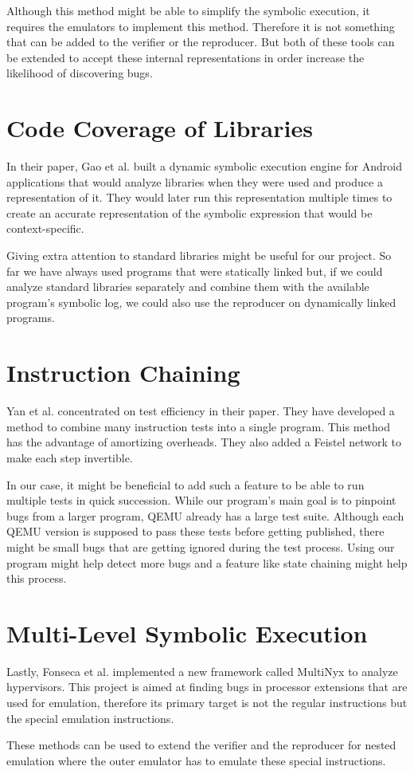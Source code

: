 Although this method might be able to simplify the symbolic execution, it requires the emulators to implement this method.
Therefore it is not something that can be added to the verifier or the reproducer.
But both of these tools can be extended to accept these internal representations in order increase the likelihood of discovering bugs.

\section{Code Coverage of Libraries}
In their paper, Gao et al. \cite{ao2018android} built a dynamic symbolic execution engine for Android applications that would analyze libraries when they were used and produce a representation of it.
They would later run this representation multiple times to create an accurate representation of the symbolic expression that would be context-specific.

Giving extra attention to standard libraries might be useful for our project.
So far we have always used programs that were statically linked but, if we could analyze standard libraries separately and combine them with the available program's symbolic log, we could also use the reproducer on dynamically linked programs.

\section{Instruction Chaining}
Yan et al. \cite{yan2018fast} concentrated on test efficiency in their paper.
They have developed a method to combine many instruction tests into a single program.
This method has the advantage of amortizing overheads.
They also added a Feistel network to make each step invertible.

In our case, it might be beneficial to add such a feature to be able to run multiple tests in quick succession.
While our program's main goal is to pinpoint bugs from a larger program, QEMU already has a large test suite.
Although each QEMU version is supposed to pass these tests before getting published, there might be small bugs that are getting ignored during the test process.
Using our program might help detect more bugs and a feature like state chaining might help this process.

\section{Multi-Level Symbolic Execution}
Lastly, Fonseca et al. \cite{fonseca2018multinyx} implemented a new framework called MultiNyx to analyze hypervisors.
This project is aimed at finding bugs in processor extensions that are used for emulation, therefore its primary target is not the regular instructions but the special emulation instructions.

These methods can be used to extend the verifier and the reproducer for nested emulation where the outer emulator has to emulate these special instructions.
